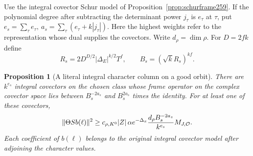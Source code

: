 \documentclass[a4paper,11pt]{article}
\newtheorem{proposition}{Proposition}[section]
\theoremstyle{definition}
\theoremstyle{remark}
\numberwithin{equation}{section}
\begin{document}
Use the integral covector Schur model of
Proposition~\ref{prop:schurframe259}. If the polynomial
degree after subtracting the determinant power \(j_\tau\)
is \(e_\tau\) at \(\tau\), put
\(e_s=\sum_\tau e_\tau,\ a_s=\sum_\tau(e_\tau+k|j_\tau|)\).
Here the highest weights refer to the representation whose
dual supplies the covectors. Write \(d_\rho=\dim\rho\).
For \(D=2fk\) define
\[
 R_s=2D^{D/2}|\Delta_E|^{k/2}T^f,\qquad
                     B_s=(\sqrt{k}R_s)^{kf}.
\]

\begin{proposition}[A literal integral character column on a good orbit]\leavevmode
\label{prop:source305}
There are \(k^{e_s}\) integral covectors on the chosen class
whose frame operator on the complex covector space lies
between \(B_s^{-2a_s}\) and \(B_s^{2a_s}\) times the identity.
For at least one of these covectors,
\[
 \|\Theta S b(\ell)\|^2\ge
  c_{\rho,K^0}|Z|\,\alpha e^{-\Delta_x}
    \frac{d_\rho B_s^{-2a_s}}{k^{e_s}}M_{J,{\cal O}} .
\]
Each coefficient of \(b(\ell)\) belongs to the original
integral covector model after adjoining the character
values.
\end{proposition}
\end{document}
